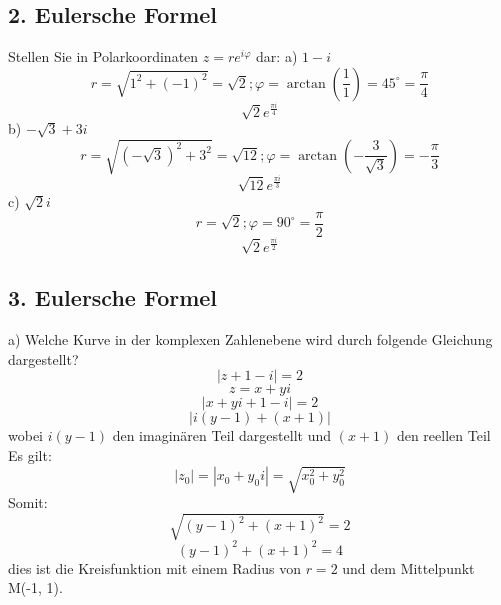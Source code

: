 \documentclass{article}
\begin{document}
    \subsection{2. Eulersche Formel}
    Stellen Sie in Polarkoordinaten $z = re^{i\varphi}$ dar:
    a) $1-i$ \begin{equation*}
        r=\sqrt{1^2+\left(-1\right)^2}=\sqrt{2}; \varphi=\arctan(\frac{1}{1})=45^{\circ}=\frac{\pi}{4}
    \end{equation*}
    \begin{equation*}
        \sqrt{2}e^{\frac{\pi i}{4}}
    \end{equation*}
    b) $-\sqrt{3}+3i$\begin{equation*}
        r=\sqrt{\left(-\sqrt{3}\right)^2+3^2}=\sqrt{12}; \varphi=\arctan(-\frac{3}{\sqrt{3}})=-\frac{\pi}{3}
    \end{equation*}
    \begin{equation*}
        \sqrt{12}e^{\frac{\pi i}{3}}
    \end{equation*}
    c) $\sqrt{2}i$\begin{equation*}
        r=\sqrt{2};\varphi=90^\circ=\frac{\pi}{2}
    \end{equation*}
    \begin{equation*}
        \sqrt{2}e^{\frac{\pi i}{2}}
    \end{equation*}

    \subsection{3. Eulersche Formel}
    a) Welche Kurve in der komplexen Zahlenebene wird durch folgende Gleichung dargestellt?
    \begin{equation*}
        | z + 1 - i | = 2 
    \end{equation*}
    \begin{equation*}
        z = x+yi
    \end{equation*}
    \begin{equation*}
        |x+yi+1-i|=2
    \end{equation*}
    \begin{equation*}
        |i(y-1)+(x+1)|
    \end{equation*}
    wobei $i(y-1)$ den imaginären Teil dargestellt und $(x+1)$ den reellen Teil\\
    Es gilt:
    \begin{equation*}
        |z_0| = |x_0 + y_0i| = \sqrt{x_0^2 + y_0^2}
    \end{equation*}
    Somit:
    \begin{equation*}
        \sqrt{\left(y-1\right)^2+\left(x+1\right)^2} = 2
    \end{equation*}
    \begin{equation*}
        \left(y-1\right)^2+\left(x+1\right)^2=4
    \end{equation*}
    dies ist die Kreisfunktion mit einem Radius von $r=2$ und dem Mittelpunkt M(-1,  1).\\\\
\end{document}
